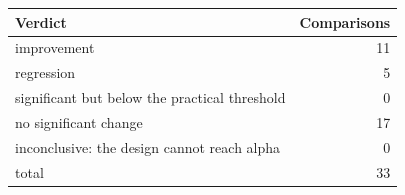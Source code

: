 \begingroup\small\setlength{\tabcolsep}{4pt}
\begin{tabular}{lr}
\toprule
\textbf{Verdict} & \textbf{Comparisons} \\
\midrule
improvement & 11 \\  %
regression & 5 \\  %
significant but below the practical threshold & 0 \\  %
no significant change & 17 \\  %
inconclusive: the design cannot reach alpha & 0 \\  %
\midrule
total & 33 \\  %
\bottomrule
\end{tabular}
\endgroup
\par\smallskip{}
